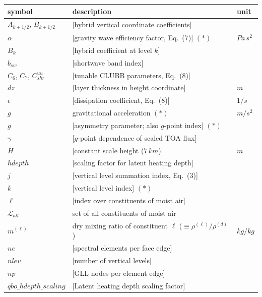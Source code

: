 \documentclass[draft]{agujournal2019}
\begin{document}
 \begin{tabular}{l l l}
  \hline
 symbol & description & unit \\
 \hline  \hline
  $A_{k+1/2}$, $B_{k+1/2}$ & [hybrid vertical coordinate coefficients] & \\
  $\alpha$ & [gravity wave efficiency factor, Eq.~(7)] $(*)$ & $Pa\,s^2$\\
  $B_k$ & [hybrid coefficient at level $k$] & \\
  $b_{sw}$ & [shortwave band index] & \\
  $C_6$, $C_7$, $C^{uu}_{shr}$ & [tunable CLUBB parameters, Eq.~(8)] & \\
  $dz$ & [layer thickness in height coordinate] & $m$\\
  $\epsilon$ & [dissipation coefficient, Eq.~(8)] & $1/s$\\
  $g$ & gravitational acceleration $(*)$ & $m/s^2$\\
  $g$ & [asymmetry parameter; also $g$-point index] $(*)$ & \\
  $\gamma$ & [$g$-point dependence of scaled TOA flux] & \\
  $H$ & [constant scale height ($7\,km$)] & $m$\\
  $hdepth$ & [scaling factor for latent heating depth] & \\
  $j$ & [vertical level summation index, Eq.~(3)] & \\
  $k$ & [vertical level index] $(*)$ & \\
  $\ell$ & [index over constituents of moist air] & \\
  $\mathcal{L}_{all}$ & set of all constituents of moist air & \\
  $m^{(\ell)}$ & dry mixing ratio of constituent $\ell$ ($\equiv \rho^{(\ell)}/\rho^{(d)}$) & $kg/kg$\\
  $ne$ & [spectral elements per face edge] & \\
  $nlev$ & [number of vertical levels] & \\
  $np$ & [GLL nodes per element edge] & \\
  $qbo\_hdepth\_scaling$ & [Latent heating depth scaling factor] & \\
 \hline
 \hline
 \end{tabular}

\newpage
\end{document}
